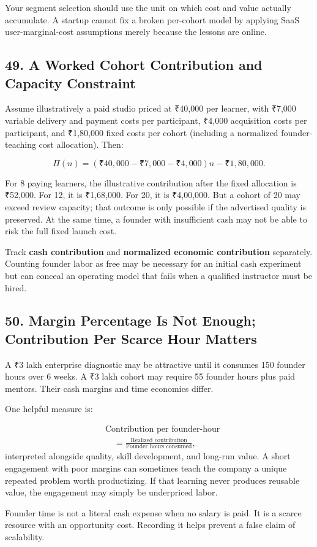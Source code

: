 Your segment selection should use the unit on which cost and value actually accumulate. A startup cannot fix a broken per-cohort model by applying SaaS user-marginal-cost assumptions merely because the lessons are online.

\subsection*{49. A Worked Cohort Contribution and Capacity Constraint}

Assume illustratively a paid studio priced at ₹40,000 per learner, with ₹7,000 variable delivery and payment costs per participant, ₹4,000 acquisition costs per participant, and ₹1,80,000 fixed costs per cohort (including a normalized founder-teaching cost allocation). Then:

\begin{equation}
\Pi(n) = (₹40{,}000 - ₹7{,}000 - ₹4{,}000)n - ₹1{,}80{,}000.
\end{equation}

For 8 paying learners, the illustrative contribution after the fixed allocation is ₹52,000. For 12, it is ₹1,68,000. For 20, it is ₹4,00,000. But a cohort of 20 may exceed review capacity; that outcome is only possible if the advertised quality is preserved. At the same time, a founder with insufficient cash may not be able to risk the full fixed launch cost.

Track \textbf{cash contribution} and \textbf{normalized economic contribution} separately. Counting founder labor as free may be necessary for an initial cash experiment but can conceal an operating model that fails when a qualified instructor must be hired.

\subsection*{50. Margin Percentage Is Not Enough; Contribution Per Scarce Hour Matters}

A ₹3 lakh enterprise diagnostic may be attractive until it consumes 150 founder hours over 6 weeks. A ₹3 lakh cohort may require 55 founder hours plus paid mentors. Their cash margins and time economics differ.

One helpful measure is:

\begin{equation}
\begin{aligned}
&\text{Contribution per founder-hour} \\
&\quad= \frac{\text{Realized contribution}}{\text{Founder hours consumed}},
\end{aligned}
\end{equation}
interpreted alongside quality, skill development, and long-run value. A short engagement with poor margins can sometimes teach the company a unique repeated problem worth productizing. If that learning never produces reusable value, the engagement may simply be underpriced labor.

Founder time is not a literal cash expense when no salary is paid. It is a scarce resource with an opportunity cost. Recording it helps prevent a false claim of scalability.
